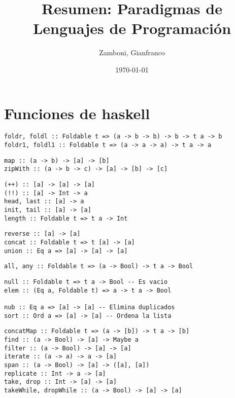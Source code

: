 \documentclass[10pt,a4paper]{article}
\begin{document}
\title{Resumen: Paradigmas de Lenguajes de Programación}

\date{\today}

\author{Zamboni, Gianfranco}

\section{Funciones de haskell}
\begin{centrado}
	\begin{verbatim}
foldr, foldl :: Foldable t => (a -> b -> b) -> b -> t a -> b
foldr1, foldl1 :: Foldable t => (a -> a -> a) -> t a -> a
	\end{verbatim}
\end{centrado} 
\begin{centrado}
	\begin{verbatim}
map :: (a -> b) -> [a] -> [b]
zipWith :: (a -> b -> c) -> [a] -> [b] -> [c]
	\end{verbatim}
\end{centrado} 
\begin{centrado}
	\begin{verbatim}
(++) :: [a] -> [a] -> [a]
(!!) :: [a] -> Int -> a
head, last :: [a] -> a
init, tail :: [a] -> [a]
length :: Foldable t => t a -> Int
	\end{verbatim}
\end{centrado} 
\begin{centrado}
	\begin{verbatim}
reverse :: [a] -> [a]
concat :: Foldable t => t [a] -> [a]
union :: Eq a => [a] -> [a] -> [a]
	\end{verbatim}
\end{centrado} 
\begin{centrado}
	\begin{verbatim}
all, any :: Foldable t => (a -> Bool) -> t a -> Bool
	\end{verbatim}
\end{centrado} 
\begin{centrado}
	\begin{verbatim}
null :: Foldable t => t a -> Bool -- Es vacio
elem :: (Eq a, Foldable t) => a -> t a -> Bool
    
nub :: Eq a => [a] -> [a] -- Elimina duplicados
sort :: Ord a => [a] -> [a] -- Ordena la lista
	\end{verbatim}
\end{centrado} 
\begin{centrado}
	\begin{verbatim}
concatMap :: Foldable t => (a -> [b]) -> t a -> [b]
find :: (a -> Bool) -> [a] -> Maybe a
filter :: (a -> Bool) -> [a] -> [a]
iterate :: (a -> a) -> a -> [a]
span :: (a -> Bool) -> [a] -> ([a], [a])
replicate :: Int -> a -> [a]
take, drop :: Int -> [a] -> [a]
takeWhile, dropWhile :: (a -> Bool) -> [a] -> [a]
	\end{verbatim}
\end{centrado} 
\end{document}
